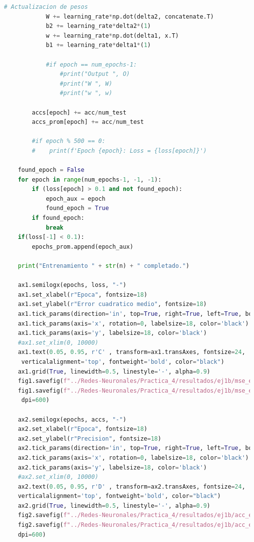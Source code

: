 \documentclass[11pt,twocolumn,twoside]{opticajnl}
\begin{document}
\begin{onecolumn}
\begin{lstlisting}[language=Python, caption={Ejercicio 1 - Arquitectura 2-1-1}, label=ej1b]
            # Actualizacion de pesos
            W += learning_rate*np.dot(delta2, concatenate.T) 
            b2 += learning_rate*delta2*(1) 
            w += learning_rate*np.dot(delta1, x.T) 
            b1 += learning_rate*delta1*(1) 

            #if epoch == num_epochs-1:
                #print("Output ", O)
                #print("W ", W)
                #print("w ", w)
    
        accs[epoch] += acc/num_test
        accs_prom[epoch] += acc/num_test

        #if epoch % 500 == 0:
        #    print(f'Epoch {epoch}: Loss = {loss[epoch]}')
    
    found_epoch = False
    for epoch in range(num_epochs-1, -1, -1):
        if (loss[epoch] > 0.1 and not found_epoch):
            epoch_aux = epoch
            found_epoch = True
        if found_epoch:
            break
    if(loss[-1] < 0.1):
        epochs_prom.append(epoch_aux)
    
    print("Entrenamiento " + str(n) + " completado.")

    ax1.semilogx(epochs, loss, "-")
    ax1.set_xlabel(r"Epoca", fontsize=18)
    ax1.set_ylabel(r"Error cuadratico medio", fontsize=18)
    ax1.tick_params(direction='in', top=True, right=True, left=True, bottom=True)
    ax1.tick_params(axis='x', rotation=0, labelsize=18, color='black')
    ax1.tick_params(axis='y', labelsize=18, color='black')
    #ax1.set_xlim(0, 10000)
    ax1.text(0.05, 0.95, r'C' , transform=ax1.transAxes, fontsize=24,
     verticalalignment='top', fontweight='bold', color="black")
    ax1.grid(True, linewidth=0.5, linestyle='-', alpha=0.9)
    fig1.savefig(f"../Redes-Neuronales/Practica_4/resultados/ej1b/mse_ej1b.pdf")
    fig1.savefig(f"../Redes-Neuronales/Practica_4/resultados/ej1b/mse_ej1b.png",
     dpi=600)

    ax2.semilogx(epochs, accs, "-")
    ax2.set_xlabel(r"Epoca", fontsize=18)
    ax2.set_ylabel(r"Precision", fontsize=18)
    ax2.tick_params(direction='in', top=True, right=True, left=True, bottom=True)
    ax2.tick_params(axis='x', rotation=0, labelsize=18, color='black')
    ax2.tick_params(axis='y', labelsize=18, color='black')
    #ax2.set_xlim(0, 10000)
    ax2.text(0.05, 0.95, r'D' , transform=ax2.transAxes, fontsize=24, 
    verticalalignment='top', fontweight='bold', color="black")
    ax2.grid(True, linewidth=0.5, linestyle='-', alpha=0.9)
    fig2.savefig(f"../Redes-Neuronales/Practica_4/resultados/ej1b/acc_ej1b.pdf")
    fig2.savefig(f"../Redes-Neuronales/Practica_4/resultados/ej1b/acc_ej1b.png", 
    dpi=600)


\end{lstlisting}
\end{onecolumn}
\end{document}

